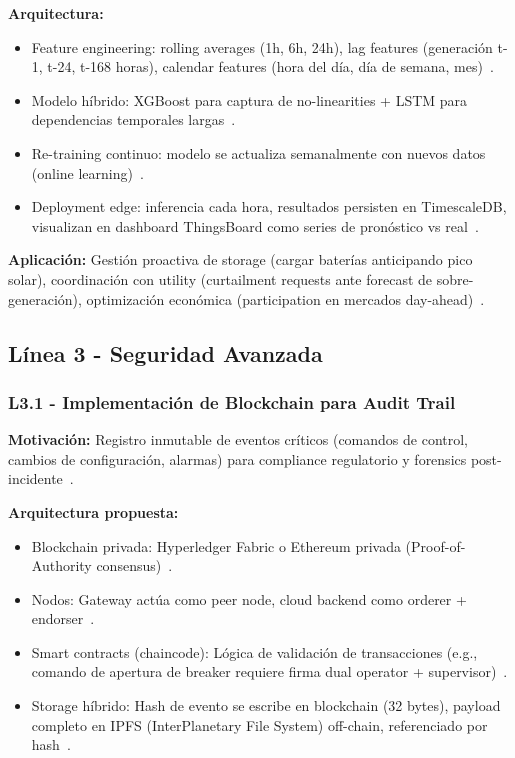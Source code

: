 \textbf{Arquitectura:}
\begin{itemize}
\item Feature engineering: rolling averages (1h, 6h, 24h), lag features (generación t-1, t-24, t-168 horas), calendar features (hora del día, día de semana, mes)~\cite{cakanDataFusionIntegrated2024}.
\item Modelo híbrido: XGBoost para captura de no-linearities + LSTM para dependencias temporales largas~\cite{miglaniDeepLearningModels2022}.
\item Re-training continuo: modelo se actualiza semanalmente con nuevos datos (online learning)~\cite{ayaUnleashingIntelligenceEdge2024}.
\item Deployment edge: inferencia cada hora, resultados persisten en TimescaleDB, visualizan en dashboard ThingsBoard como series de pronóstico vs real~\cite{pereraScalableDataanalyticCapable2024}.
\end{itemize}

\textbf{Aplicación:} Gestión proactiva de storage (cargar baterías anticipando pico solar), coordinación con utility (curtailment requests ante forecast de sobre-generación), optimización económica (participation en mercados day-ahead)~\cite{cohenEdgeComputingEnabled2024}.

\subsection{Línea 3 - Seguridad Avanzada}

\subsubsection{L3.1 - Implementación de Blockchain para Audit Trail}

\textbf{Motivación:} Registro inmutable de eventos críticos (comandos de control, cambios de configuración, alarmas) para compliance regulatorio y forensics post-incidente~\cite{cervinskiIoTSecurityDApp2024,chengLightweightAuthenticationDrivenTrusted2024,m.mijwilPostQuantumSecureBlockchainBased2025}.

\textbf{Arquitectura propuesta:}
\begin{itemize}
\item Blockchain privada: Hyperledger Fabric o Ethereum privada (Proof-of-Authority consensus)~\cite{BlockchainBasedSecureAuthentication2025}.
\item Nodos: Gateway actúa como peer node, cloud backend como orderer + endorser~\cite{ferragRemoteAttestationSecurity2023}.
\item Smart contracts (chaincode): Lógica de validación de transacciones (e.g., comando de apertura de breaker requiere firma dual operator + supervisor)~\cite{cervinskiIoTSecurityDApp2024}.
\item Storage híbrido: Hash de evento se escribe en blockchain (32 bytes), payload completo en IPFS (InterPlanetary File System) off-chain, referenciado por hash~\cite{alrobaiSecurePartitioningEmbedded2024}.
\end{itemize}

